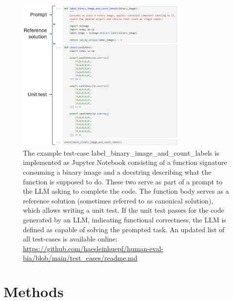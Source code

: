 \documentclass{ecai}
\begin{document}
\begin{figure}[h]
    \centering
    \includegraphics[width=8.5cm]{example_test_case.png}
    \caption{The example test-case label\_binary\_image\_and\_count\_labels is implemented as Jupyter Notebook consisting of a function signature consuming a binary image and a docstring describing what the function is supposed to do. These two serve as part of a prompt to the LLM asking to complete the code. The function body serves as a reference solution (sometimes referred to as canonical solution), which allows writing a unit test. If the unit test passes for the code generated by an LLM, indicating functional correctness, the LLM is defined as capable of solving the prompted task. An updated list of all test-cases is available online: 
    \url{https://github.com/haesleinhuepf/human-eval-bia/blob/main/test_cases/readme.md}
    \newline
    \newline
    }
    \label{fig:exampletestcase}
    \end{figure}


\section{Methods}
\end{document}
